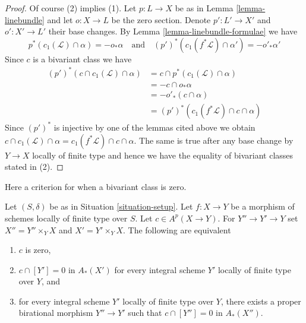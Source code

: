 \begin{proof}
Of course (2) implies (1).
Let $p : L \to X$ be as in Lemma \ref{lemma-linebundle} and let $o : X \to L$
be the zero section. Denote $p' : L' \to X'$ and $o' : X' \to L'$
their base changes. By Lemma \ref{lemma-linebundle-formulae} we have
$$
p^*(c_1(\mathcal{L}) \cap \alpha) = - o_* \alpha
\quad\text{and}\quad
(p')^*(c_1(f^*\mathcal{L}) \cap \alpha') = - o'_* \alpha'
$$
Since $c$ is a bivariant class we have
\begin{align*}
(p')^*(c \cap c_1(\mathcal{L}) \cap \alpha)
& =
c \cap p^*(c_1(\mathcal{L}) \cap \alpha) \\
& =
- c \cap o_* \alpha \\
& =
- o'_*(c \cap \alpha) \\
& =
(p')^*(c_1(f^*\mathcal{L}) \cap c \cap \alpha)
\end{align*}
Since $(p')^*$ is injective by one of the lemmas cited above we obtain
$c \cap c_1(\mathcal{L}) \cap \alpha =
c_1(f^*\mathcal{L}) \cap c \cap \alpha$.
The same is true after any base change by $Y \to X$ locally of finite type
and hence we have the equality of bivariant classes stated in (2).
\end{proof}

\noindent
Here a criterion for when a bivariant class is zero.

\begin{lemma}
\label{lemma-bivariant-zero}
Let $(S, \delta)$ be as in Situation \ref{situation-setup}.
Let $f : X \to Y$ be a morphism of schemes locally of finite type over $S$.
Let $c \in A^p(X \to Y)$. For $Y'' \to Y' \to Y$ set
$X'' = Y'' \times_Y X$ and $X' = Y' \times_Y X$.
The following are equivalent
\begin{enumerate}
\item $c$ is zero,
\item $c \cap [Y'] = 0$ in $A_*(X')$ for every integral scheme $Y'$
locally of finite type over $Y$, and
\item for every integral scheme $Y'$ locally of finite type over $Y$,
there exists a proper birational morphism $Y'' \to Y'$ such that
$c \cap [Y''] = 0$ in $A_*(X'')$.
\end{enumerate}
\end{lemma}

